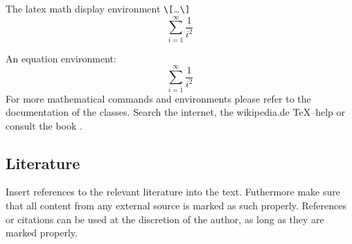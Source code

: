 The latex math display environment \verb+\[+\ldots\verb+\]+
\[
  \sum_{i=1}^{\infty} \frac{1}{i^2}
\]

An equation environment:
\begin{equation}
  \label{eq:eq}
  \sum_{i=1}^{\infty} \frac{1}{i^2}
\end{equation}
For more mathematical commands and environments please refer to the documentation of the \AmS{} classes. Search the internet, the wikipedia.de \TeX--help or consult the book \cite{sturm2007}.
\subsection{Literature}
Insert references to the relevant literature into the text. Futhermore make sure that all content from any external source is marked as such properly. References or citations can be used at the discretion of the author, as long as they are marked properly.\\
\cite{oden_reddy_2011}\\
\cite{nackenhorst_2004}\\
\cite{holzapfel_2000}\\
\cite{zienkiewicz_taylor_1989}\\
\cite{ziefle_2008}\\
\cite{sagar_2010}